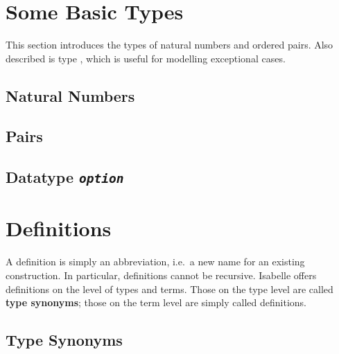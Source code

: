 \begin{exercise}\label{ex:Tree}
%
\end{exercise}






\section{Some Basic Types}

This section introduces the types of natural numbers and ordered pairs.  Also
described is type , which is useful for modelling exceptional
cases. 

\subsection{Natural Numbers}
\label{sec:nat}%

\medskip




\subsection{Pairs}


\subsection{Datatype {\tt\slshape option}}
\label{sec:option}


\section{Definitions}
\label{sec:Definitions}

A definition is simply an abbreviation, i.e.\ a new name for an existing
construction. In particular, definitions cannot be recursive. Isabelle offers
definitions on the level of types and terms. Those on the type level are
called \textbf{type synonyms}; those on the term level are simply called 
definitions.


\subsection{Type Synonyms}

